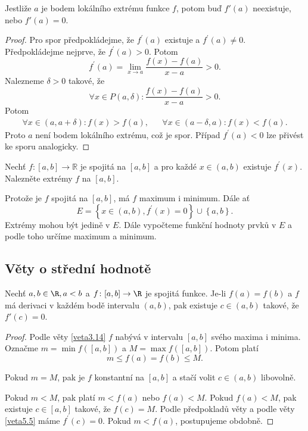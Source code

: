 \begin{veta} \label{veta5.5}
Jestliže $a$ je bodem lokálního extrému funkce $f$, potom buď $f'(a)$ neexistuje, nebo $f'(a)=0$.
\end{veta}

\begin{proof}
	Pro spor předpokládejme, že $f^\prime(a)$ existuje a $f^\prime(a)\ne 0$. Předpokládejme nejprve, že
	$f^\prime(a)>0$. Potom
	$$
	    f^\prime(a) = \lim_{x\to a} \frac{f(x)-f(a)}{x-a} > 0.
	$$
	Nalezneme $\delta > 0$ takové, že
	$$
	    \forall x \in P(a, \delta) : \frac{f(x)-f(a)}{x-a} > 0.
	$$
	Potom
	\begin{align*}
	    \forall x \in (a,a+\delta): f(x)>f(a), && \forall x \in (a-\delta, a): f(x) < f(a).
	\end{align*}
	Proto $a$ není bodem lokálního extrému, což je spor. Případ $f^\prime(a)<0$ lze přivést
	ke sporu analogicky.
\end{proof}

\begin{priklad}
	Nechť $f:\left [ a,b \right ] \to \mathbb R $ je spojitá na $\left [ a,b \right ] $ a
	pro každé $x \in (a,b)$ existuje $f^\prime(x)$. Nalezněte extrémy $f$ na $\left [ a,b \right ] $.
\end{priklad}

\begin{reseni}
	Protože je $f$ spojitá na $\left [ a,b \right ] $, má $f$ maximum i minimum.
	Dále ať $$E=\left \{ x\in (a,b), f^\prime(x)=0 \right \} \cup \left \{ a,b \right \}.  $$
	Extrémy mohou být jedině v $E$. Dále vypočteme funkční hodnoty prvků v $E$ a podle toho
	určíme maximum a minimum.
\end{reseni}

\subsection{Věty o střední hodnotě}
\begin{veta}[Rolle] \label{veta5.6}
Nechť $a,b \in \R, a<b$ a $f\colon[a,b]\to\R$ je spojitá funkce. Je-li $f(a)=f(b)$ a $f$ má derivaci v každém bodě intervalu $(a,b)$, pak existuje $c\in(a,b)$ takové, že $f'(c)=0$.
\end{veta}

\begin{proof}
	Podle věty \ref{veta3.14} $f$ nabývá v intervalu $\left [ a,b \right ] $ svého maxima i minima.
	Označme $m=\min f (\left [ a,b \right ])  $ a $M = \max f (\left [ a,b \right ])$.  Potom platí
	$$
	    m \leq f(a) = f(b) \leq M.
	$$
	\par Pokud $m=M$, pak je $f$ konstantní na $\left [ a,b \right ] $ a stačí volit $c \in (a,b)$ libovolně.
	\par Pokud $m < M$, pak platí $m< f(a)$ nebo $f(a)< M$. Pokud $f(a)<M$, pak existuje $c\in \left [ a,b \right ] $
	takové, že $f(c)=M.$ Podle předpokladů věty a podle věty \ref{veta5.5} máme $f^\prime(c)=0$.
	Pokud $m<f(a)$, postupujeme obdobně.
\end{proof}

